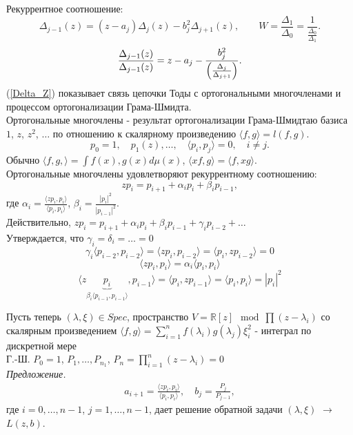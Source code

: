 \documentclass[a4paper,12pt]{article}
\theoremstyle{definition}
\theoremstyle{definition}
\theoremstyle{definition}
\newcommand{\bear}[1]{\begin{eqnarray}\label{#1}}
\newcommand{\ear}{\end{eqnarray}}
\newcommand{\R}{ {\mathbb R} }
\begin{document}
Рекуррентное соотношение:
\[\Delta_{j-1}(z) = (z-a_{j})\Delta_{j}(z) - b^{2}_{j}\Delta_{j+1}(z), \qquad W=\frac{\Delta_{1}}{\Delta_{0}} = \frac{1}{\frac{\Delta_{0}}{\Delta_{1}}}.\]
\[\displaystyle\frac{\Delta_{j-1}(z)}{\Delta_{j-1}(z)} = z - a_{j} - \displaystyle\frac{b^{2}_{j}}{\Bigl(\frac{\Delta_{j}}{\Delta_{j+1}}\Bigr)}.\]
(\ref{Delta_Z}) показывает связь цепочки Тоды с ортогональными многочленами и процессом  ортогонализации Грама-Шмидта.\\
Ортогональные многочлены - результат ортогонализации Грама-Шмидтаю базиса $1$, $z$, $z^{2}$, $\ldots$  по отношению к скалярному произведению
$\langle f,g \rangle = l(f,g)$.\\
\[p_{0} = 1, \quad p_{1}(z), \ldots, \quad \langle p_{i},p_{j}\rangle = 0, \quad i\neq j.\]
Обычно $\langle f,g,\rangle = \int {f(x),g(x)}d\mu(x)$, $\langle x f,g \rangle = \langle f,x g \rangle$.\\
Ортогональные многочлены удовлетворяют рекуррентному соотношению: 
\[zp_{i} = p_{i+1} + \alpha_{i}p_{i} + \beta_{i}p_{i-1},\]
где $\alpha_{i} = \displaystyle\frac{\langle z p_{i}, p_{i}\rangle}{\langle p_{i}, p_{i} \rangle}$, $\beta_{i} = \displaystyle\frac{|p_{i}|^{2}}{|p_{i-1}|^{2}}$.\\

Действительно, $zp_{i} = p_{i+1} + \alpha_{i}p_{i} + \beta_{i}p_{i-1} + \gamma_{i}p_{i-2} + \ldots$\\

Утверждается, что $\gamma_{i} = \delta_{i} = \ldots = 0$\\
\[\gamma_{i} \langle p_{i-2}, p_{i-2}\rangle = \langle z p_{i}, p_{i-2}\rangle = \langle p_{i}, z p_{i-2}\rangle =0\]
\[\langle z p_{i}, p_{i}\rangle = \alpha_{i}\langle p_{i},p_{i}\rangle\]
\[\langle z \underbrace{p_{i}}_{\beta_{i}\langle p_{i-1},p_{i-1}\rangle},p_{i-1}\rangle = \langle p_{i}, zp_{i-1}\rangle = \langle p_{i},p_{i}\rangle   = |p_{i}|^{2}\]

Пусть теперь $(\lambda,\xi) \in Spec$, пространство $V = \R[z] \mod \prod (z - \lambda_{i})$ со скалярным произведением
$\langle f,g \rangle = \displaystyle\sum^{n}_{i=1}f(\lambda_{i})g(\lambda_{j}) \xi^{2}_{i}$ - интеграл по дискретной мере\\
Г.-Ш. $P_{0} = 1$, $P_{1},\ldots,P_{n_1}$, $P_{n} = \displaystyle\prod^{n}_{i=1}(z-\lambda_{i}) =0$\\

\textit{Предложение.} \\
\bear{def_a_b}
a_{i+1} = \displaystyle\frac{\langle zp_{i},p_{i}\rangle}{\langle p_{i},p_{i} \rangle},\quad b_{j} = \frac{P_{j}}{P_{j-1}},
\ear 
где $i=0,\ldots,n-1$, $j=1,\ldots,n-1$, дает решение обратной задачи $(\lambda, \xi)$ $\rightarrow$ $L(z,b)$.\\
\end{document}
